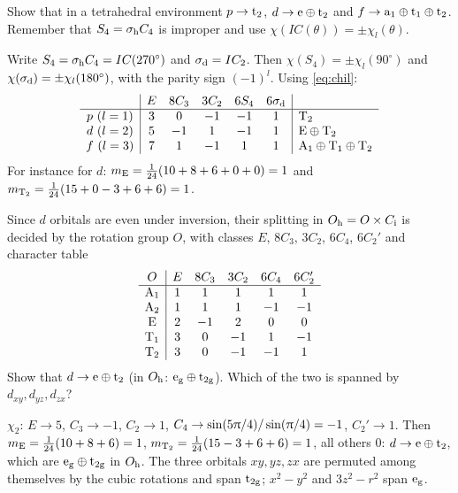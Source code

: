 \begin{exercise}\label{ex:5:Td}
Show that in a tetrahedral environment $p\to\mathrm{t}_2$, $d\to\mathrm{e}\oplus\mathrm{t}_2$
and $f\to\mathrm{a}_1\oplus\mathrm{t}_1\oplus\mathrm{t}_2$. Remember that $S_4=\sigma_{\mathrm{h}} C_4$ is
improper and use $\chi(IC(\theta))=\pm\chi_l(\theta)$.
\end{exercise}

\begin{solution}
Write $S_4=\sigma_{\mathrm{h}} C_4=IC(270^\circ)$ and $\sigma_{\mathrm{d}}=IC_2$. Then
$\chi(S_4)=\pm\chi_l(90^\circ)$ and $\chi(\sigma_{\mathrm{d}})=\pm\chi_l(180^\circ)$, with the parity sign
$(-1)^l$. Using \eqref{eq:chil}:
\[
\begin{array}{c|ccccc|l}
 & E & 8C_3 & 3C_2 & 6S_4 & 6\sigma_{\mathrm{d}} & \\\hline
p\ (l=1) & 3 & 0 & -1 & -1 & 1 & \mathrm{T}_2\\
d\ (l=2) & 5 & -1 & 1 & -1 & 1 & \mathrm{E}\oplus\mathrm{T}_2\\
f\ (l=3) & 7 & 1 & -1 & 1 & 1 & \mathrm{A}_1\oplus\mathrm{T}_1\oplus\mathrm{T}_2
\end{array}
\]
For instance for $d$: $m_{\mathrm{E}}=\tfrac1{24}(10+8+6+0+0)=1$ and
$m_{\mathrm{T}_2}=\tfrac1{24}(15+0-3+6+6)=1$.
\end{solution}

\begin{exercise}\label{ex:5:Oh}
Since $d$ orbitals are even under inversion, their splitting in $O_{\mathrm{h}}=O\times C_{\mathrm{i}}$ is
decided by the rotation group $O$, with classes $E$, $8C_3$, $3C_2$, $6C_4$, $6C_2'$
and character table
\[
\begin{array}{c|ccccc}
O & E & 8C_3 & 3C_2 & 6C_4 & 6C_2'\\\hline
\mathrm{A}_1&1&1&1&1&1\\ \mathrm{A}_2&1&1&1&-1&-1\\ \mathrm{E}&2&-1&2&0&0\\
\mathrm{T}_1&3&0&-1&1&-1\\ \mathrm{T}_2&3&0&-1&-1&1
\end{array}
\]
Show that $d\to\mathrm{e}\oplus\mathrm{t}_2$ (in $O_{\mathrm{h}}$: $\mathrm{e}_{\mathrm{g}}\oplus\mathrm{t}_{2\mathrm{g}}$).
Which of the two is spanned by $d_{xy},d_{yz},d_{zx}$?
\end{exercise}

\begin{solution}
$\chi_2$: $E\to5$, $C_3\to-1$, $C_2\to1$, $C_4\to\sin(5\uppi/4)/\sin(\uppi/4)=-1$,
$C_2'\to1$. Then $m_{\mathrm{E}}=\tfrac1{24}(10+8+6)=1$, $m_{\mathrm{T}_2}=\tfrac1{24}(15-3+6+6)=1$,
all others $0$: $d\to\mathrm{e}\oplus\mathrm{t}_2$, which are $\mathrm{e}_{\mathrm{g}}\oplus\mathrm{t}_{2\mathrm{g}}$
in $O_{\mathrm{h}}$. The three orbitals $xy,yz,zx$ are permuted among themselves by the cubic
rotations and span $\mathrm{t}_{2\mathrm{g}}$; $x^2-y^2$ and $3z^2-r^2$ span $\mathrm{e}_{\mathrm{g}}$.
\end{solution}

